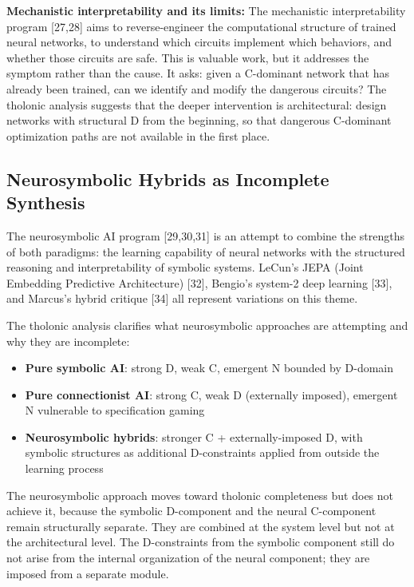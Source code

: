 \documentclass[12pt]{article}
\providecommand{\tightlist}{%
  \setlength{\itemsep}{0pt}\setlength{\parskip}{0pt}}
\begin{document}
\textbf{Mechanistic interpretability and its limits:} The mechanistic
interpretability program {[}27,28{]} aims to reverse-engineer the
computational structure of trained neural networks, to understand which
circuits implement which behaviors, and whether those circuits are safe.
This is valuable work, but it addresses the symptom rather than the
cause. It asks: given a C-dominant network that has already been
trained, can we identify and modify the dangerous circuits? The tholonic
analysis suggests that the deeper intervention is architectural: design
networks with structural D from the beginning, so that dangerous
C-dominant optimization paths are not available in the first place.

\subsection{Neurosymbolic Hybrids as Incomplete Synthesis}\label{neurosymbolic-hybrids-as-incomplete-synthesis}

The neurosymbolic AI program {[}29,30,31{]} is an attempt to combine the
strengths of both paradigms: the learning capability of neural networks
with the structured reasoning and interpretability of symbolic systems.
LeCun's JEPA (Joint Embedding Predictive Architecture) {[}32{]},
Bengio's system-2 deep learning {[}33{]}, and Marcus's hybrid critique
{[}34{]} all represent variations on this theme.

The tholonic analysis clarifies what neurosymbolic approaches are
attempting and why they are incomplete:

\begin{itemize}
\tightlist
\item
  \textbf{Pure symbolic AI}: strong D, weak C, emergent N bounded by
  D-domain
\item
  \textbf{Pure connectionist AI}: strong C, weak D (externally imposed),
  emergent N vulnerable to specification gaming
\item
  \textbf{Neurosymbolic hybrids}: stronger C + externally-imposed D,
  with symbolic structures as additional D-constraints applied from
  outside the learning process
\end{itemize}

The neurosymbolic approach moves toward tholonic completeness but does
not achieve it, because the symbolic D-component and the neural
C-component remain structurally separate. They are combined at the
system level but not at the architectural level. The D-constraints from
the symbolic component still do not arise from the internal organization
of the neural component; they are imposed from a separate module.
\end{document}

